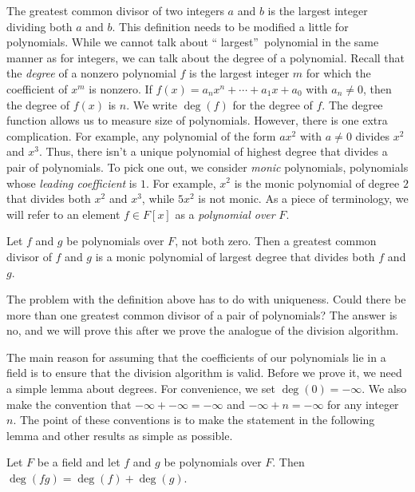 The greatest common divisor of two integers $a$ and $b$ is the largest integer
dividing both $a$ and $b$. This definition needs to be modified a little for
polynomials. While we cannot talk about \textquotedblleft
largest\textquotedblright\ polynomial in the same manner as for integers, we
can talk about the degree of a polynomial. Recall that the
%
\emph{degree} of a nonzero polynomial $f$ is the largest integer $m$ for which
the coefficient of $x^{m}$ is nonzero. If $f(x)=a_{n}x^{n}+\cdots+a_{1}%
x+a_{0}$ with $a_{n}\neq0$, then the degree of $f(x)$ is $n$. We write
$\deg(f)$ for the degree of $f$. The degree function allows us to measure size
of polynomials. However, there is one extra complication. For example, any
polynomial of the form $ax^{2}$ with $a\neq0$ divides $x^{2}$ and $x^{3}$.
Thus, there isn't a unique polynomial of highest degree that divides a pair of
polynomials. To pick one out, we consider
%
\emph{monic} polynomials, polynomials whose
%
\emph{leading coefficient} is $1$. For example, $x^{2}$ is the monic
polynomial of degree $2$ that divides both $x^{2}$ and $x^{3}$, while $5x^{2}$
is not monic. As a piece of terminology, we will refer to an element $f\in
F[x]$ as a \emph{polynomial over }$F$.

\begin{definition}
Let $f$ and $g$ be polynomials over $F$, not both zero. Then a greatest common
divisor of $f$ and $g$ is a monic polynomial of largest degree that divides
both $f$ and $g$.
\end{definition}

The problem with the definition above has to do with uniqueness. Could there
be more than one greatest common divisor of a pair of polynomials? The answer
is no, and we will prove this after we prove the analogue of the division algorithm.

The main reason for assuming that the coefficients of our polynomials lie in a
field is to ensure that the division algorithm is valid. Before we prove it,
we need a simple lemma about degrees. For convenience, we set $\deg
(0)=-\infty$. We also make the convention that $-\infty+-\infty=-\infty$ and
$-\infty+n=-\infty$ for any integer $n$. The point of these conventions is to
make the statement in the following lemma and other results as simple as possible.

\begin{lemma}
\label{degree}Let $F$ be a field and let $f$ and $g$ be polynomials over $F$.
Then $\deg(fg)=\deg(f)+\deg(g)$.
\end{lemma}

